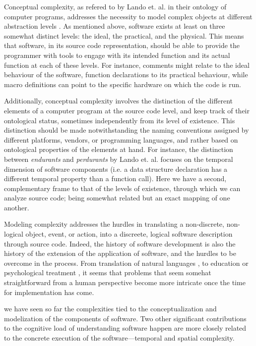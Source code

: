 Conceptual complexity, as refered to by Lando et. al. in their ontology of computer programs, addresses the necessity to model complex objects at different abstraction levels \citep{lando_general_2007}. As mentioned above, software exists at least on three somewhat distinct levels: the ideal, the practical, and the physical. This means that software, in its source code representation, should be able to provide the programmer with tools to engage with its intended function and its actual function at each of these levels. For instance, comments might relate to the ideal behaviour of the software, function declarations to its practical behaviour, while macro definitions can point to the specific hardware on which the code is run.


Additionally, conceptual complexity involves the distinction of the different elements of a computer program at the source code level, and keep track of their ontological status, sometimes independently from its level of existence. This distinction should be made notwithstanding the naming conventions assigned by different platforms, vendors, or programming languages, and rather based on ontological properties of the elements at hand. For instance, the distinction between \emph{endurants} and \emph{perdurants} by Lando et. al. focuses on the temporal dimension of software components (i.e. a data structure declaration has a different temporal property than a function call). Here we have a second, complementary frame to that of the levels of existence, through which we can analyze source code; being somewhat related but an exact mapping of one another.

Modeling complexity addresses the hurdles in translating a non-discrete, non-logical object, event, or action, into a discreete, logical software description through source code. Indeed, the history of software development is also the history of the extension of the application of software, and the hurdles to be overcome in the process. From translation of natural languages \citep{poibeau_machine_2017}, to education \citep{watters_teaching_2021} or psychological treatment \citep{weizenbaum_computer_1976}, it seems that problems that seem somehat straightforward from a human perspective become more intricate once the time for implementation has come.

we have seen so far the complexities tied to the conceptualization and modelization of the components of software. Two other significant contributions to the cognitive load of understanding software happen are more closely related to the concrete execution of the software—temporal and spatial complexity.

